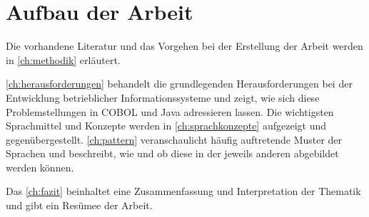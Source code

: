 \section{Aufbau der Arbeit}

Die vorhandene Literatur und das Vorgehen bei der Erstellung der Arbeit werden in \autoref{ch:methodik} erläutert. 

\autoref{ch:herausforderungen} behandelt die grundlegenden Herausforderungen bei der Entwicklung betrieblicher Informationssysteme und zeigt, wie sich diese Problemstellungen in COBOL und Java adressieren lassen. Die wichtigsten Sprachmittel und Konzepte werden in \autoref{ch:sprachkonzepte} aufgezeigt und gegenübergestellt. \autoref{ch:pattern} veranschaulicht häufig auftretende Muster der Sprachen und beschreibt, wie und ob diese in der jeweils anderen abgebildet werden können. 

Das \autoref{ch:fazit} beinhaltet eine Zusammenfassung und Interpretation der Thematik und gibt ein Re­sü­mee der Arbeit.